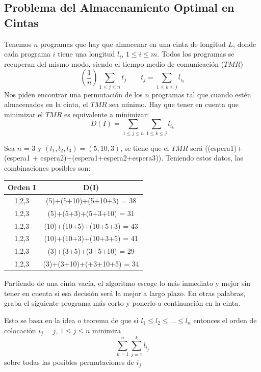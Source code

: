 \documentclass[10pt,a4paper,spanish]{report}
\theoremstyle{definition}
\theoremstyle{remark}
\begin{document}
\subsection{\textcolor{electriccrimson}Problema del Almacenamiento Optimal en Cintas}

Tenemos $n$ programas que hay que almacenar en una cinta de longitud $L$, donde cada programa $i$ tiene una longitud $l_i$, $1 \leq i \leq m$. Todos los programas se recuperan del mismo modo, siendo el tiempo medio de comunicación ($TMR$)
\begin{displaymath}
    \left(\frac{1}{n}\right)\sum_{1 \leq j \leq n}t_j \qquad t_j = \sum_{1 \leq k \leq j}l_{i_k}
\end{displaymath}
Nos piden encontrar una permutación de los $n$ programas tal que cuando estén almacenados en la cinta, el $TMR$ sea mínimo. Hay que tener en cuenta que minimizar el $TMR$ es equivalente a minimizar:
\begin{displaymath}
    D(I) = \sum_{1 \leq j \leq n}\sum_{1 \leq k \leq j}l_{i_k}
\end{displaymath}

Sea $n$ = 3 y $(l_1,l_2,l_3) = (5,10,3)$, se tiene que el $TMR$ será ((espera1)+(espera1 + espera2)+(espera1+espera2+espera3)). Teniendo estos datos, las combinaciones posibles son:\\
\begin{center}
\begin{tabular}{c|c}
    Orden I & D(I)\\
    \hline
    1,2,3 & (5)+(5+10)+(5+10+3) = 38 \\
    1,2,3 & (5)+(5+3)+(5+3+10) = 31 \\
    1,2,3 & (10)+(10+5)+(10+5+3) = 43 \\
    1,2,3 & (10)+(10+3)+(10+3+5) = 41 \\
    1,2,3 & (3)+(3+5)+(3+5+10) = 29 \\
    1,2,3 & (3)+(3+10)+(+3+10+5) = 34 \\
\end{tabular}
\end{center}

Partiendo de una cinta vacía, el algoritmo escoge lo más inmediato y mejor sin tener en cuenta si esa decisión será la mejor a largo plazo. En otras palabras, graba el siguiente programa más corto y ponerlo a continuación en la cinta.

Esto se basa en la idea o teorema de que si $l_1 \leq l_2 \leq \ldots \leq l_n$ entonces el orden de colocación $i_j=j$, $1\leq j \leq n$ minimiza
\begin{displaymath}
    \sum_{k=1}^n\sum_{j=1}^kl_{i_{j}}
\end{displaymath}
sobre todas las posibles permutaciones de $i_j$
\end{document}
